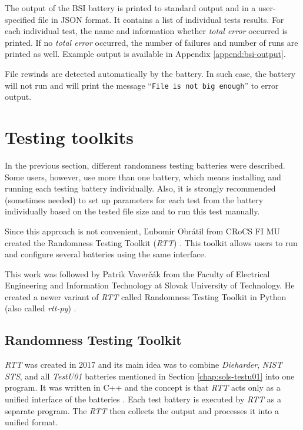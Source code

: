 \documentclass[
  digital,     %
  oneside,     %
  nosansbold,  %
  nocolorbold, %
  nolof,         %
  nolot,         %
]{fithesis4}
\begin{document}
The output of the BSI battery is printed to standard output and in a user-specified file in JSON format. It contains a list of individual tests results. For each individual test, the name and information whether \emph{total error} occurred is printed. If no \emph{total error} occurred, the number of failures and number of runs are printed as well. Example output is available in Appendix \ref{append:bsi-output}.

File rewinds are detected automatically by the battery. In such case, the battery will not run and will print the message ``\texttt{File is not big enough}'' to error output.



\section{Testing toolkits}\label{chap:sols-toolkits}
In the previous section, different randomness testing batteries were described. Some users, however, use more than one battery, which means installing and running each testing battery individually. Also, it is strongly recommended (sometimes needed) to set up parameters for each test from the battery individually based on the tested file size and to run this test manually.

Since this approach is not convenient, Ľubomír Obrátil from CRoCS FI MU created the Randomness Testing Toolkit (\emph{RTT}) \cite{rtt-site}. This toolkit allows users to run and configure several batteries using the same interface.

This work was followed by Patrik Vaverčák from the Faculty of Electrical Engineering and Information Technology at Slovak University of Technology. He created a newer variant of \emph{RTT} called Randomness Testing Toolkit in Python (also called \emph{rtt-py}) \cite{rtt-py-site}. 

\subsection{Randomness Testing Toolkit} \label{chap:sols-rtt}

\emph{RTT} was created in 2017 and its main idea was to combine \emph{Dieharder}, \emph{NIST STS}, and all \emph{TestU01} batteries mentioned in Section \ref{chap:sols-testu01} into one program. It was written in C++ and the concept is that \emph{RTT} acts only as a unified interface of the batteries \cite[p.~8]{rtt-obratil}. Each test battery is executed by \emph{RTT} as a separate program. The \emph{RTT} then collects the output and processes it into a unified format.
\end{document}
